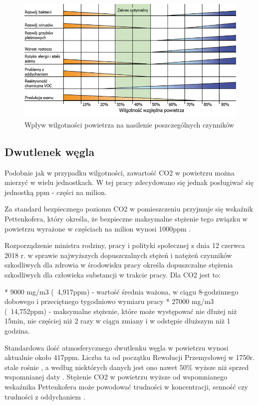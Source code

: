 \documentclass[a4paper, 12pt]{article}
\begin{document}
\begin{figure}[!h]
    \includegraphics[width=\textwidth]{zdj/wilgotnosc_powietrza_w_pomieszczeniach.jpg}
    \caption{Wpływ wilgotności powietrza na nasilenie poszczególnych czynników}
\end{figure}

\subsection{Dwutlenek węgla}

Podobnie jak w przypadku wilgotności, zawartość CO2 w powietrzu można mierzyć w wielu jednostkach. 
W tej pracy zdecydowano się jednak posługiwać się jednostką ppm - części na milion.

Za standard bezpiecznego poziomu CO2 w pomieszczeniu przyjmuje się wskaźnik Pettenkofera, który określa, 
że bezpieczne maksymalne stężenie tego związku w powietrzu wyrażone w częściach na milion wynosi 1000ppm \cite{pettenhofer}.

Rozporządzenie ministra rodziny, pracy i polityki społecznej z dnia 12 czerwca 2018 r. w sprawie 
najwyższych dopuszczalnych stężeń i natężeń czynników szkodliwych dla zdrowia w środowisku \cite{min-stezenia} pracy określa 
dopuszczalne stężenia szkodliwych dla człowieka substancji w trakcie pracy. Dla CO2 jest to:

* 9000 mg/m3 (~4,917ppm) - wartość średnia ważona, w ciągu 8-godzinnego dobowego i przeciętnego tygodniowo wymiaru pracy
* 27000 mg/m3 (~14,752ppm) - maksymalne stężenie, które może występować nie dłużej niż 15min, nie częściej niż 2 razy w ciągu zmiany i w odstępie dłuższym niż 1 godzina.

Standardowa ilość atmosferycznego dwutlenku węgla w powietrzu wynosi aktualnie około 417ppm. 
Liczba ta od początku Rewolucji Przemysłowej w 1750r. stale rośnie \cite{atmo-co2-change}, a według niektórych danych jest 
ono nawet 50\% wyższe niż sprzed wspomnianej daty \cite{50-percent}. Stężenie CO2 w powietrzu wyższe od 
wspomnianego wskaźnika Pettenkofera może powodować trudności w koncentracji, senność czy 
trudności z oddychaniem \cite{pettenhofer}.
\end{document}
